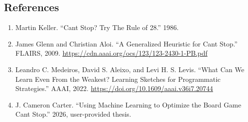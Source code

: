 \documentclass[
  11pt,
]{article}
\providecommand{\tightlist}{%
  \setlength{\itemsep}{0pt}\setlength{\parskip}{0pt}}
\begin{document}
\subsection{References}\label{references}

\begin{enumerate}
\def\labelenumi{\arabic{enumi}.}
\tightlist
\item
  Martin Keller. ``Can\textquotesingle t Stop? Try The Rule of 28.''
  1986.
\item
  James Glenn and Christian Aloi. ``A Generalized Heuristic for
  Can\textquotesingle t Stop.'' FLAIRS, 2009.
  \url{https://cdn.aaai.org/ocs/123/123-2430-1-PB.pdf}
\item
  Leandro C. Medeiros, David S. Aleixo, and Levi H. S. Levis. ``What Can
  We Learn Even From the Weakest? Learning Sketches for Programmatic
  Strategies.'' AAAI, 2022.
  \url{https://doi.org/10.1609/aaai.v36i7.20744}
\item
  J. Cameron Carter. ``Using Machine Learning to Optimize the Board Game
  Can\textquotesingle t Stop.'' 2026, user-provided thesis.
\end{enumerate}
\end{document}
